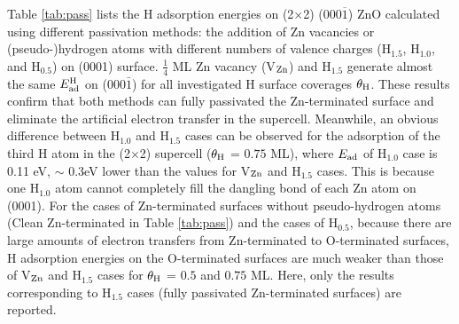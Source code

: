 Table \ref{tab:pass} lists the H adsorption energies on (2$\times$2) (000$\overline{1}$) ZnO calculated using different passivation methods: the addition of Zn vacancies or (pseudo-)hydrogen atoms with different numbers of valence charges (H$_{1.5}$, H$_{1.0}$, and H$_{0.5}$) on (0001) surface. 
$\frac{1}{4}$ ML Zn vacancy (V$_{\textup{Zn}}$) and H$_{1.5}$ generate almost the same $E_{\textup{ad}}^{\textup{H}}$ on (000$\bar{1}$) for all investigated H surface coverages $\theta_{\textup{H}}$. These results confirm that both methods can fully passivated the Zn-terminated surface and eliminate the artificial electron transfer in the supercell. Meanwhile, an obvious difference between  H$_{1.0}$ and H$_{1.5}$ cases can be observed for the adsorption of the third H atom in the (2$\times$2) supercell ($\theta_{\textup{H}}$ = $0.75$ ML), where $E_{\textup{ad}}$ of H$_{1.0}$ case is 0.11 eV, $\sim$ 0.3eV lower than the values for V$_{\textup{Zn}}$ and H$_{1.5}$ cases. This is because one H$_{1.0}$ atom cannot completely fill the dangling bond of each Zn atom on (0001). For the cases of Zn-terminated surfaces without pseudo-hydrogen atoms (Clean Zn-terminated in Table \ref{tab:pass}) and the cases of H$_{0.5}$, because there are large amounts of electron transfers from Zn-terminated to O-terminated surfaces, H adsorption energies on the O-terminated surfaces are much weaker than those of V$_{\textup{Zn}}$ and H$_{1.5}$ cases for $\theta_{\textup{H}}$ = $0.5$ and $0.75$ ML. Here, only the results corresponding to H$_{1.5}$ cases (fully passivated Zn-terminated surfaces) are reported.
